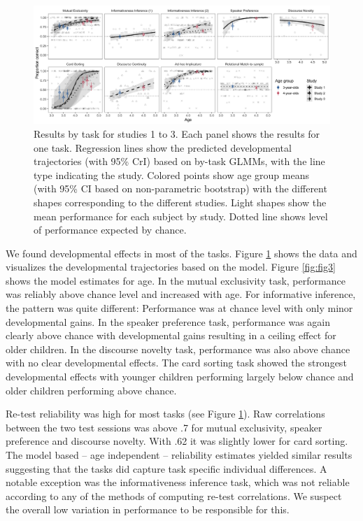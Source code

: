 \documentclass[
  english,
  man,floatsintext]{apa6}
\begin{document}
\begin{figure}

{\centering \includegraphics[width=1\linewidth]{./figures/figure2} 

}

\caption{Results by task for studies 1 to 3. Each panel shows the results for one task. Regression lines show the predicted developmental trajectories (with 95\% CrI) based on by-task GLMMs, with the line type indicating the study. Colored points show age group means (with 95\% CI based on non-parametric bootstrap) with the different shapes corresponding to the different studies. Light shapes show the mean performance for each subject by study. Dotted line shows level of performance expected by chance.}\label{fig:fig2}
\end{figure}

We found developmental effects in most of the tasks. Figure \ref{fig:fig2} shows the data and visualizes the developmental trajectories based on the model. Figure \ref{fig:fig3} shows the model estimates for age. In the mutual exclusivity task, performance was reliably above chance level and increased with age. For informative inference, the pattern was quite different: Performance was at chance level with only minor developmental gains. In the speaker preference task, performance was again clearly above chance with developmental gains resulting in a ceiling effect for older children. In the discourse novelty task, performance was also above chance with no clear developmental effects. The card sorting task showed the strongest developmental effects with younger children performing largely below chance and older children performing above chance.

Re-test reliability was high for most tasks (see Figure \ref{fig:fig2}). Raw correlations between the two test sessions was above .7 for mutual exclusivity, speaker preference and discourse novelty. With .62 it was slightly lower for card sorting. The model based -- age independent -- reliability estimates yielded similar results suggesting that the tasks did capture task specific individual differences. A notable exception was the informativeness inference task, which was not reliable according to any of the methods of computing re-test correlations. We suspect the overall low variation in performance to be responsible for this.
\end{document}

